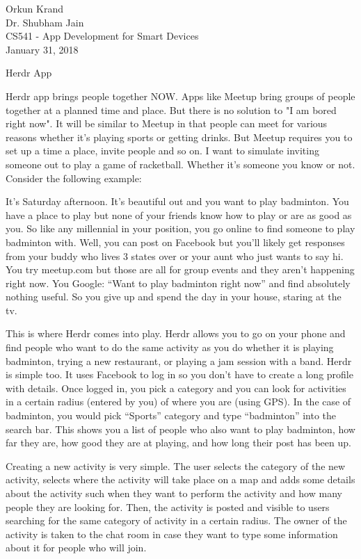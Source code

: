 \documentclass{article}
\begin{document}
\raggedright

Orkun Krand \\ Dr. Shubham Jain \\ CS541 - App Development for Smart Devices \\ January 31, 2018
    
    
	\centerline{Herdr App} 

Herdr app brings people together NOW. Apps like Meetup bring groups of people together at a planned time and place. But there is no solution to "I am bored right now". It will be similar to Meetup in that people can meet for various reasons whether it's playing sports or getting drinks. But Meetup requires you to set up a time a place, invite people and so on. I want to simulate inviting someone out to play a game of racketball. Whether it's someone you know or not. Consider the following example:
\hfill \linebreak

It's Saturday afternoon. It's beautiful out and you want to play badminton. You have a place to play but none of your friends know how to play or are as good as you. So like any millennial in your position, you go online to find someone to play badminton with. Well, you can post on Facebook but you'll likely get responses from your buddy who lives 3 states over or your aunt who just wants to say hi. You try meetup.com but those are all for group events and they aren't happening right now. You Google: ``Want to play badminton right now'' and find absolutely nothing useful. So you give up and spend the day in your house, staring at the tv.
\hfill \linebreak

This is where Herdr comes into play. Herdr allows you to go on your phone and find people who want to do the same activity as you do whether it is playing badminton, trying a new restaurant, or playing a jam session with a band. Herdr is simple too. It uses Facebook to log in so you don't have to create a long profile with details. Once logged in, you pick a category and you can look for activities in a certain radius (entered by you) of where you are (using GPS). In the case of badminton, you would pick ``Sports'' category and type ``badminton'' into the search bar. This shows you a list of people who also want to play badminton, how far they are, how good they are at playing, and how long their post has been up.
\hfill \linebreak 

Creating a new activity is very simple. The user selects the category of the new activity, selects where the activity will take place on a map and adds some details about the activity such when they want to perform the activity and how many people they are looking for. Then, the activity is posted and visible to users searching for the same category of activity in a certain radius. The owner of the activity is taken to the chat room in case they want to type some information about it for people who will join.
\hfill \linebreak
\end{document}

